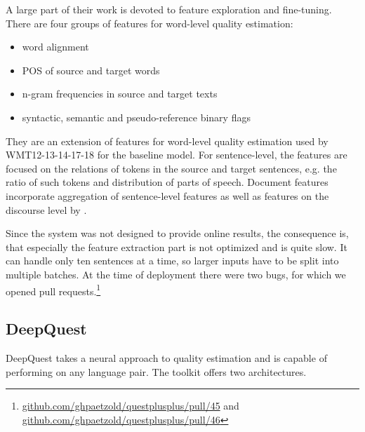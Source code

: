 A large part of their work is devoted to feature exploration and fine-tuning. There are four groups of features for word-level quality estimation:

\begin{itemize}
    \item word alignment
    \item POS of source and target words
    \item n-gram frequencies in source and target texts
    \item syntactic, semantic and pseudo-reference binary flags
\end{itemize}

They are an extension of features for word-level quality estimation used by WMT12-13-14-17-18 for the baseline model. For sentence-level, the features are focused on the relations of tokens in the source and target sentences, e.g. the ratio of such tokens and distribution of parts of speech. Document features incorporate aggregation of sentence-level features as well as features on the discourse level by \cite{scarton_reading:2016}.

Since the system was not designed to provide online results, the consequence is, that especially the feature extraction part is not optimized and is quite slow. It can handle only ten sentences at a time, so larger inputs have to be split into multiple batches. At the time of deployment there were two bugs, for which we opened pull requests.\footnote{\href{https://github.com/ghpaetzold/questplusplus/pull/45}{github.com/ghpaetzold/questplusplus/pull/45} and \\ \ttab[0.5] \href{https://github.com/ghpaetzold/questplusplus/pull/46}{github.com/ghpaetzold/questplusplus/pull/46}}


\subsection{DeepQuest}
DeepQuest \citep{deepquest} takes a neural approach to quality estimation and is capable of performing on any language pair. The toolkit offers two architectures.

